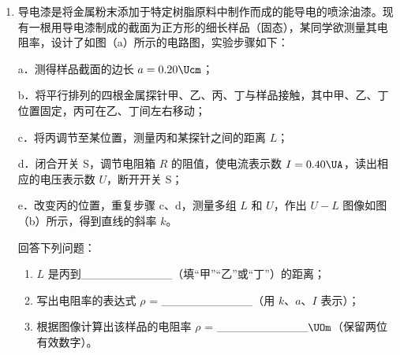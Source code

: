 \documentclass[\gkver]{gaokaozhenti}
\begin{document}
\begin{enumerate}
\item
导电漆是将金属粉末添加于特定树脂原料中制作而成的能导电的喷涂油漆。现有一根用导电漆制成的截面为正方形的细长样品（固态），某同学欲测量其电阻率，设计了如图（a）所示的电路图，实验步骤如下：

a．测得样品截面的边长 $a=0.20\Ucm$；

b．将平行排列的四根金属探针甲、乙、丙、丁与样品接触，其中甲、乙、丁位置固定，丙可在乙、丁间左右移动；

c．将丙调节至某位置，测量丙和某探针之间的距离 $L$；

d．闭合开关 S，调节电阻箱 $R$ 的阻值，使电流表示数 $I=0.40\UA$，读出相应的电压表示数 $U$，断开开关 S；

e．改变丙的位置，重复步骤 c、d，测量多组 $L$ 和 $U$，作出 $U - L$ 图像如图（b）所示，得到直线的斜率 $k$。

回答下列问题：
\begin{enumerate}
	\item
	$L$ 是丙到\_\_\_\_\_\_\_\_\_\_\_（填“甲”“乙”或“丁”）的距离；
	\item
	写出电阻率的表达式 $\rho$ = \_\_\_\_\_\_\_\_\_\_\_（用 $k$、$a$、$I$ 表示）；
	\item
	根据图像计算出该样品的电阻率 $\rho$ = \_\_\_\_\_\_\_\_\_\_\_$\UOm$（保留两位有效数字）。
\end{enumerate}


\end{enumerate}
\end{document}

